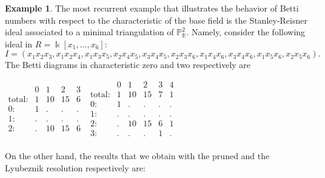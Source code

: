 \documentclass[12pt]{amsart}
\theoremstyle{definition}
\newtheorem{example}[theorem]{Example}
\theoremstyle{remark}
\numberwithin{equation}{section}
\newcommand{\bR}{\mathbb{R}}
\newcommand\kk{\Bbbk}
\begin{document}
\begin{example} \label{ex_p}
The most recurrent example that illustrates the behavior of Betti numbers with respect to the characteristic of the base field
is the Stanley-Reisner ideal associated to a minimal triangulation of $\mathbb{P}_{\bR}^2$.
Namely, consider the following ideal in $R=\kk[x_1,\dots, x_6]$:
$$
I=(x_1x_2x_3,x_1x_2x_4,x_1x_3x_5,x_2x_4x_5,x_3x_4x_5,x_2x_3x_6,x_1x_4x_6,x_3x_4x_6,x_1x_5x_6,x_2x_5x_6).
$$
%
%
The Betti diagrams in characteristic zero and two respectively are
%
%
\begin{center}
{\small $\begin{matrix}
&0&1&2&3\\\text{total:}&1&10&15&6\\\text{0:}&1&\text{.}&\text{.}&\text{.}\\\text{1:}&\text{.}&\text{.}&\text{.}&\text{.}\\\text{2:}&\text{.}&10&15&6\\\end{matrix}
$ \hskip 3cm $\begin{matrix}
&0&1&2&3&4\\\text{total:}&1&10&15&7&1\\\text{0:}&1&\text{.}&\text{.}&\text{.}&\text{.}\\\text{1:}&\text{.}&\text{.}&\text{.}&\text{.}&\text{.}\\\text{2:}&\text{.}&10&15&6&1\\\text{3:}&\text{.}&\text{.}&\text{.}&1&\text{.}\\\end{matrix}
$}
\end{center}
%
%
On the other hand, the results that we obtain with the pruned and the Lyubeznik resolution respectively are:

\vskip 2mm


\end{example}
\end{document}
